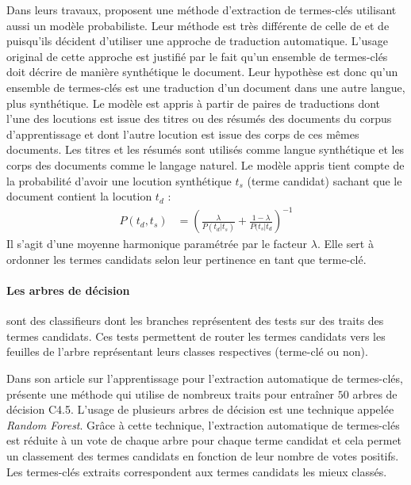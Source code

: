         Dans leurs travaux, \citet{liu2011vocabularygap} proposent une méthode
        d'extraction de termes-clés utilisant aussi un modèle probabiliste. Leur
        méthode est très différente de celle de \citet{witten1999kea} et de
        \citet{sujian2003maximumentropy} puisqu'ils décident d'utiliser une
        approche de traduction automatique. L'usage original de cette approche est
        justifié par le fait qu'un ensemble de termes-clés doit décrire de manière
        synthétique le document. Leur hypothèse est donc qu'un ensemble de
        termes-clés est une traduction d'un document dans une autre langue, plus
        synthétique. Le modèle est appris à partir de paires de traductions dont
        l'une des locutions est issue des titres ou des résumés des documents du corpus
        d'apprentissage et dont l'autre locution est issue des corps de ces mêmes
        documents. Les titres et les résumés sont utilisés comme langue
        synthétique et les corps des documents comme le langage naturel. Le modèle
        appris tient compte de la probabilité d'avoir une locution synthétique $t_s$
        (terme candidat) sachant que le document contient la locution $t_d$ :
          \begin{align}
            P(t_d, t_s) &= \left(\frac{\lambda}{P(t_d | t_s)} + \frac{1 - \lambda}{P(t_s | t_d}\right)^{-1}
          \end{align}
        Il s'agit d'une moyenne harmonique paramétrée par le facteur $\lambda$.
        Elle sert à ordonner les termes candidats selon leur pertinence en tant
        que terme-clé.

      \paragraph{Les arbres de décision}
        sont des classifieurs dont les branches représentent des tests sur des
        traits des termes candidats. Ces tests permettent de router les termes
        candidats vers les feuilles de l'arbre représentant leurs classes
        respectives (terme-clé ou non).

        Dans son article sur l'apprentissage pour l'extraction automatique de
        termes-clés, \citet{turney1999learningalgorithms} présente une méthode qui
        utilise de nombreux traits pour entraîner $50$ arbres de décision C4.5.
        L'usage de plusieurs arbres de décision est une technique appelée
        \textit{Random Forest}. Grâce à cette technique, l'extraction automatique
        de termes-clés est réduite à un vote de chaque arbre pour chaque terme
        candidat et cela permet un classement des termes candidats en fonction de
        leur nombre de votes positifs. Les termes-clés extraits correspondent aux
        termes candidats les mieux classés.

